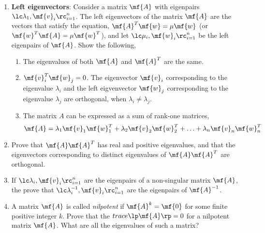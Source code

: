 \begin{enumerate}[resume]
     \item \textbf{Left eigenvectors}: Consider a matrix $\mf{A}$ with eigenpairs $\lc \lambda_1, \mf{v}_i\rc_{i=1}^n$. The left eigenvectors of the matrix $\mf{A}$ are the vectors that satisfy the equation, $\mf{A}^T\mf{w} = \mu \mf{w}$ (or $\mf{w}^T\mf{A} = \mu \mf{w}^T$), and let $\lc \mu_i, \mf{w}_i\rc_{i=1}^n$ be the left eigenpairs of $\mf{A}$. Show the following,
     \begin{enumerate}
         \item The eigenvalues of both $\mf{A}$ and $\mf{A}^T$ are the same.
         \item $\mf{v}_i^T\mf{w}_j = 0$. The eigenvector $\mf{v}_i$ corresponding to the eigenvalue $\lambda_i$ and the left eigvenvector $\mf{w}_j$ corresponding to the eigenvalue $\lambda_j$ are orthogonal, when $\lambda_i \neq \lambda_j$.
         \item The matrix $A$ can be expressed as a sum of rank-one matrices,
         \[ \mf{A} = \lambda_1\mf{v}_1\mf{w}_1^T + \lambda_2\mf{v}_2\mf{w}_2^T + \ldots + \lambda_n\mf{v}_n\mf{w}_n^T\]
     \end{enumerate}

     \item Prove that $\mf{A}\mf{A}^T$ has real and positive eigenvalues, and that the eigenvectors corresponding to distinct eigenvalues of $\mf{A}\mf{A}^T$ are orthogonal.

     \item If $\lc \lambda_i, \mf{v}_i\rc_{i=1}^n$ are the eigenpairs of a non-singular matrix $\mf{A}$, the prove that $\lc \lambda_i^{-1}, \mf{v}_i\rc_{i=1}^n$ are the eigenpairs of $\mf{A}^{-1}$.

     \item A matrix $\mf{A}$ is called \textit{nilpotent} if $\mf{A}^k = \mf{0}$ for some finite positive integer $k$. Prove that the $trace\lp \mf{A}\rp = 0$ for a nilpotent matrix $\mf{A}$. What are all the eigenvalues of such a matrix?

\end{enumerate}
